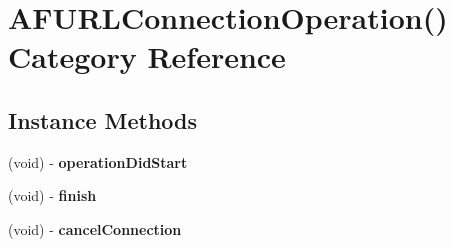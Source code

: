 \hypertarget{category_a_f_u_r_l_connection_operation_07_08}{}\section{A\+F\+U\+R\+L\+Connection\+Operation() Category Reference}
\label{category_a_f_u_r_l_connection_operation_07_08}
\subsection*{Instance Methods}
\begin{DoxyCompactItemize}
\item 
\mbox{\label{category_a_f_u_r_l_connection_operation_07_08_adb3f442720957460984d98ba4656f237}} 
(void) -\/ {\bfseries operation\+Did\+Start}
\item 
\mbox{\label{category_a_f_u_r_l_connection_operation_07_08_afa07116e9179944df7fcb762c8c4ddd3}} 
(void) -\/ {\bfseries finish}
\item 
\mbox{\label{category_a_f_u_r_l_connection_operation_07_08_a049154202d6a6d7fddab2c887b411b66}} 
(void) -\/ {\bfseries cancel\+Connection}
\end{DoxyCompactItemize}
